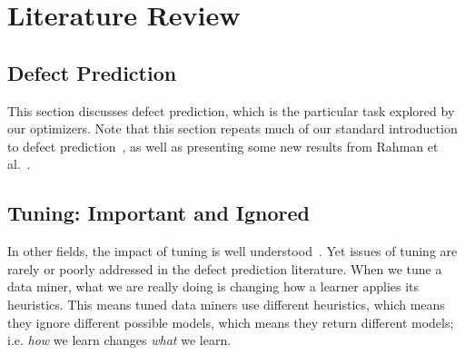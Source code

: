 \section{Literature Review} 


\subsection{Defect Prediction}


This section discusses defect prediction,
which is the particular
task explored by our optimizers.
Note that this section repeats much of 
our standard introduction to defect prediction~\cite{me15:book1},
as well as presenting    some new results from Rahman et al.~\cite{rahman14:icse}. 
 





 


\subsection{Tuning: Important and Ignored}

In  other fields, the impact of tuning is well understood~\cite{Bergstra2012}. 
Yet issues of tuning  are rarely or poorly addressed
in the defect prediction literature.
When we tune a data miner, what we are really doing is changing how a learner applies
its heuristics. This means tuned data miners use different heuristics, which means they ignore different possible models, which means they return different models; i.e.  {\em how} we learn changes {\em what} we learn.

